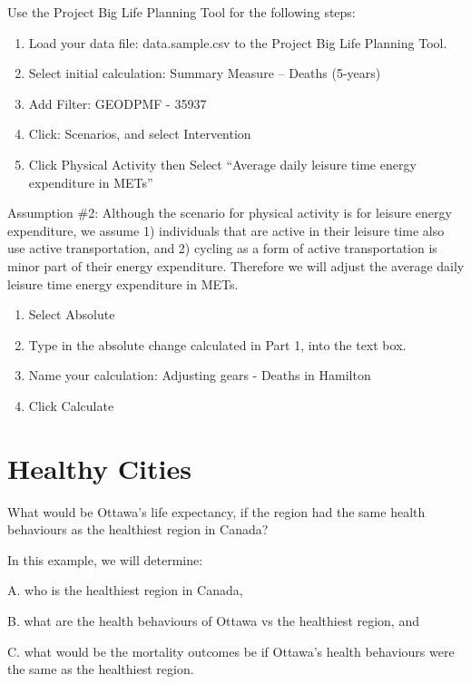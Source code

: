 \documentclass[]{book}
\begin{document}
Use the Project Big Life Planning Tool for the following steps:

\begin{enumerate}
\def\labelenumi{\arabic{enumi}.}
\item
  Load your data file: data.sample.csv to the Project Big Life Planning
  Tool.
\item
  Select initial calculation: Summary Measure -- Deaths (5-years)
\item
  Add Filter: GEODPMF - 35937
\item
  Click: Scenarios, and select Intervention
\item
  Click Physical Activity then Select ``Average daily leisure time
  energy expenditure in METs''
\end{enumerate}

Assumption \#2: Although the scenario for physical activity is for
leisure energy expenditure, we assume 1) individuals that are active in
their leisure time also use active transportation, and 2) cycling as a
form of active transportation is minor part of their energy expenditure.
Therefore we will adjust the average daily leisure time energy
expenditure in METs.

\begin{enumerate}
\def\labelenumi{\arabic{enumi}.}
\setcounter{enumi}{5}
\item
  Select Absolute
\item
  Type in the absolute change calculated in Part 1, into the text box.
\item
  Name your calculation: Adjusting gears - Deaths in Hamilton
\item
  Click Calculate
\end{enumerate}

\section{Healthy Cities}\label{healthy-cities}

What would be Ottawa's life expectancy, if the region had the same
health behaviours as the healthiest region in Canada?

In this example, we will determine:

A. who is the healthiest region in Canada,

B. what are the health behaviours of Ottawa vs the healthiest region,
and

C. what would be the mortality outcomes be if Ottawa's health behaviours
were the same as the healthiest region.
\end{document}
